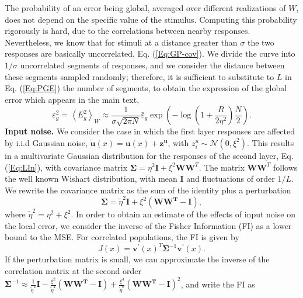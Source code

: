 \documentclass[a4paper]{article}%
\begin{document}
The probability of an error being global,
averaged over different realizations of $W$, does not depend on the specific
value of the stimulus. Computing this probability rigorously is hard, due to
the correlations between nearby responses. Nevertheless, we know that for
stimuli at a distance greater than $\sigma$ the two responses are basically
uncorrelated, Eq. (\ref{Eq:GP-cov}). We divide the curve into
$1/\sigma$ uncorrelated segments of responses, and we consider the distance between these segments sampled randomly; therefore, it is sufficient to substitute to 
$L$ in Eq. (\ref{Eq:PGE}) the number of segments, to obtain the expression of the global error which appears in the main text,
\begin{equation}
\varepsilon_{g}^{2} = \left\langle E_{g}^{2}\right\rangle _{W} \approx\frac{1
}{\sigma\sqrt{2\pi N}}\bar{\varepsilon}_{g} \exp{\left(  -\log\left(  1 +
\frac{R} {2\eta^{2}}\right)  \frac{N}{2} \right)  }.
\end{equation}
\newline\newline\textbf{Input noise.} We consider the case in which the first
layer responses are affected by i.i.d Gaussian noise, $\mathbf{\tilde u}(x) =
\mathbf{u}(x) + \mathbf{z^{u}} $, with $z^{u}_{i} \sim\mathcal{N}(0,\xi^{2})$.
This results in a multivariate Gaussian distribution for the responses of the
second layer, Eq. (\ref{Eq:LIn}), with covariance matrix $\bm{\Sigma}= \eta^{2}
\mathbf{I} + \xi^{2} \mathbf{W} \mathbf{W}^{T}.$ The matrix $\mathbf{W}\mathbf{W}^{T}$ follows the well known Wishart distribution,
with mean $\mathbf{I}$ and fluctuations of order $1/L$. We rewrite the
covariance matrix as the sum of the identity plus a perturbation
\begin{equation}
\bm{\Sigma}= \tilde\eta^{2} \mathbf{I} + \xi^{2}(\mathbf{WW^T -I}),
\end{equation}
where $\tilde\eta^{2} = \eta^{2} + \xi^{2} $. In order to obtain an estimate
of the effects of input noise on the local error, we consider the inverse of
the Fisher Information (FI) as a lower bound to the MSE. For correlated
populations, the FI is given by \cite{Shamir2006ImplicationsCoding}
\begin{equation}
J(x) = \mathbf{v^{\prime}}(x)^{T} \bm{\Sigma}^{-1}\mathbf{v^{\prime}}(x).
\end{equation}
If the perturbation matrix is small, we can approximate the inverse of the
correlation matrix at the second order \newline$\bm{\Sigma}^{-1} \approx\frac
{1}{\tilde\eta^{2}} \mathbf{I} - \frac{\xi^{2}}{\tilde\eta^{4}} \left(
\mathbf{WW^T}-\mathbf{I}\right)  + \frac{\xi^{4}} {\tilde\eta^{6}}\left(
\mathbf{WW^T}-\mathbf{I}\right)  ^{2} $, and write the FI as
\end{document}
